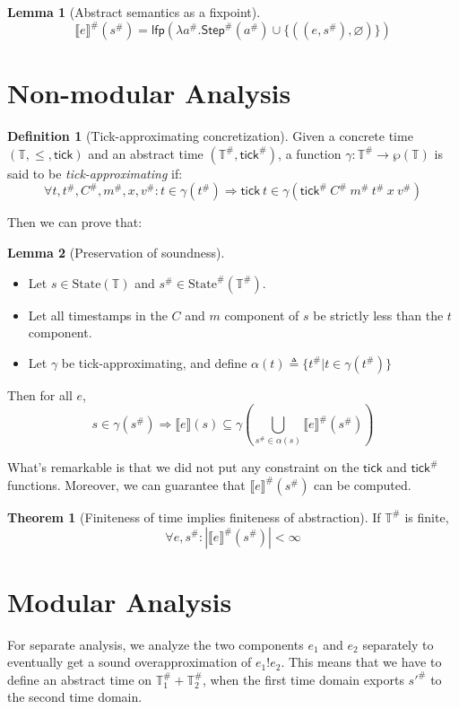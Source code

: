 \documentclass[acmsmall,screen,review]{acmart}
\theoremstyle{definition}
\newtheorem{definition}{Definition}[section]
\newtheorem{lem}{Lemma}[section]
\newtheorem{thm}{Theorem}[section]
\newcommand*{\A}[1]{{#1}^{\#}}
\newcommand*{\Time}{\mathbb{T}}
\newcommand*{\ATime}{\A{\Time}}
\newcommand*{\mem}{m}
\newcommand*{\Config}[1]{\text{State}({#1})}
\newcommand*{\AConfig}[1]{\A{\text{State}}({#1})}
\newcommand*{\link}[2]{{#1}\mathtt{!}{#2}}
\newcommand*{\sembracket}[1]{\lBrack{#1}\rBrack}
\newcommand*{\tick}{\mathsf{tick}}
\begin{document}
\begin{lem}[Abstract semantics as a fixpoint]
  \[
    \A{\sembracket{e}}(\A{s})=\mathsf{lfp}(\lambda \A{a}.\A{\mathsf{Step}}(\A{a})\cup\{((e,\A{s}),\varnothing)\})
  \]
\end{lem}

\section{Non-modular Analysis}
\begin{definition}[Tick-approximating concretization]
  Given a concrete time $(\Time,\le,\tick)$ and an abstract time $(\ATime, \A\tick)$, a function $\gamma:\ATime\rightarrow\wp(\Time)$ is said to be \emph{tick-approximating} if:
  \[
    \forall t,\A{t},\A{C},\A{\mem},x,\A{v}:t\in\gamma(\A{t})\Rightarrow\tick\:t\in\gamma(\A{\tick}\:\A{C}\:\A\mem\:\A{t}\:x\:\A{v})
  \]
\end{definition}

Then we can prove that:
\begin{lem}[Preservation of soundness]
  $\:$

  \begin{itemize}
    \item Let $s\in\Config{\Time}$ and $\A{s}\in\AConfig{\ATime}$.
    \item Let all timestamps in the $C$ and $\mem$ component of $s$ be strictly less than the $t$ component.
    \item Let $\gamma$ be tick-approximating, and define $\alpha(t)\triangleq\{\A{t}|t\in\gamma(\A{t})\}$
  \end{itemize}

  Then for all $e$,
  \[
    s\in\gamma(\A{s})\Rightarrow\sembracket{e}(s)\subseteq\gamma\left(\bigcup_{\A{s}\in\alpha(s)}\A{\sembracket{e}}(\A{s})\right)
  \]
\end{lem}

What's remarkable is that we did not put any constraint on the $\tick$ and $\A{\tick}$ functions.
Moreover, we can guarantee that $\A{\sembracket{e}}(\A{s})$ can be computed.

\begin{thm}[Finiteness of time implies finiteness of abstraction]
  If $\ATime$ is finite,
  \[
    \forall e,\A{s}: |\A{\sembracket{e}}(\A{s})|<\infty
  \]
\end{thm}

\section{Modular Analysis}
For separate analysis, we analyze the two components $e_1$ and $e_2$ separately to eventually get a sound overapproximation of $\link{e_1}{e_2}$.
This means that we have to define an abstract time on $\ATime_1+\ATime_2$, when the first time domain exports $\A{s'}$ to the second time domain.
\end{document}
